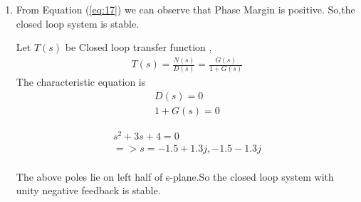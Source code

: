 \begin{enumerate}[label=\thesection.\arabic*.,ref=\thesection.\theenumi]
\item
From Equation (\ref{eq:17}) we can observe that Phase Margin is positive. So,the closed loop system is stable.

Let $T(s)$ be Closed loop transfer function ,
\begin{align}
T(s)=\frac{N(s)}{D(s)}=\frac{G(s)}{1+G(s)}
\end{align}
The characteristic equation is 
\begin{align}
D(s)=0  \\
1+G(s)=0 
\end{align}

\begin{align}
s^{2}+3s+4=0 \\
=> s=-1.5+1.3j,-1.5-1.3j
\end{align}
\\
The above poles lie on left half of s-plane.So the closed loop system with unity negative feedback is stable.



\end{enumerate}

